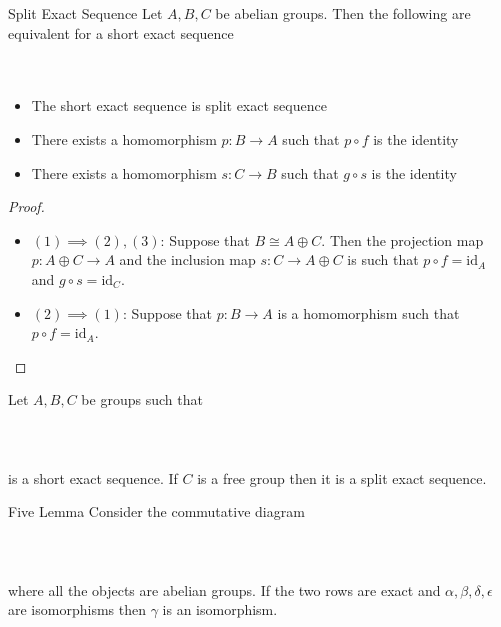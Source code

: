 \documentclass[a4paper]{article}
\begin{document}
\begin{prp}{Split Exact Sequence}{} Let $A,B,C$ be abelian groups. Then the following are equivalent for a short exact sequence \\~\\
\\
\begin{itemize}
\item The short exact sequence is split exact sequence
\item There exists a homomorphism $p:B\to A$ such that $p\circ f$ is the identity
\item There exists a homomorphism $s:C\to B$ such that $g\circ s$ is the identity
\end{itemize} \tcbline
\begin{proof}~\\
\begin{itemize}
\item $(1)\implies(2),(3)$: Suppose that $B\cong A\oplus C$. Then the projection map $p:A\oplus C\to A$ and the inclusion map $s:C\to A\oplus C$ is such that $p\circ f=\text{id}_A$ and $g\circ s=\text{id}_C$. 
\item $(2)\implies(1)$: Suppose that $p:B\to A$ is a homomorphism such that $p\circ f=\text{id}_A$. 
\end{itemize}
\end{proof}
\end{prp}

\begin{prp}{}{} Let $A,B,C$ be groups such that \\~\\
\\~\\
is a short exact sequence. If $C$ is a free group then it is a split exact sequence. 
\end{prp}

\begin{lmm}{Five Lemma}{} Consider the commutative diagram \\~\\
\\~\\
where all the objects are abelian groups. If the two rows are exact and $\alpha,\beta,\delta,\epsilon$ are isomorphisms then $\gamma$ is an isomorphism. 
\end{lmm}
\end{document}
